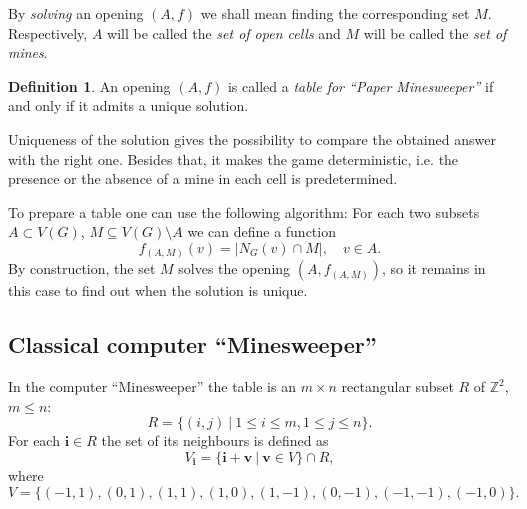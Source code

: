 \documentclass[english,12pt]{article}
\theoremstyle{remark}
\theoremstyle{definition}
\newtheorem{definition}{Definition}
\theoremstyle{definition}
\newcommand{\bsi}{{\boldsymbol i}}
\newcommand{\bsv}{{\boldsymbol v}}
\begin{document}
By \emph{solving} an opening $(A,f)$ we shall mean finding the
corresponding set $M$. Respectively, $A$ will be called the
\emph{set of open cells} and $M$ will be called the \emph{set of
mines}.

\begin{definition} \label{d:table}
An opening $(A,f)$ is called a \emph{table for ``Paper Minesweeper''} if and only if it admits a
unique solution.
\end{definition}

Uniqueness of the solution gives the possibility to compare the obtained answer with the right one.
Besides that, it makes the game deterministic, i.e. the presence or the absence of a mine in each
cell is predetermined.

To prepare a table one can use the following algorithm: For each
two subsets $A \subset V(G)$, $M \subseteq V(G) \setminus  A$ we
can define a function
\begin{equation}\label{fam}
f_{(A,M)}(v) = |N_G(v) \cap M|, \quad v \in A.
\end{equation}
By construction, the set $M$ solves the opening $(A,f_{(A,M)})$,
so it remains in this case to find out when the solution is
unique.














\subsection{Classical computer ``Minesweeper''}
  In the computer ``Minesweeper'' the table is an $m\times n$ rectangular subset $R$ of
  $\mathbb Z^2$, $m \leq n$:
  \[ R=\{(i,j)\ |\ 1 \leq i\leq m, 1 \leq j \leq n \}. \]
  For each $\bsi\in R$ the set of its neighbours is defined as
  \[ V_\bsi = \{ \bsi+\bsv\ |\ \bsv \in V\} \cap R, \]
  where
  \[ V=\{ (-1,1),(0,1),(1,1),(1,0),(1,-1),(0,-1),(-1,-1),(-1,0)\}. \]
\end{document}
